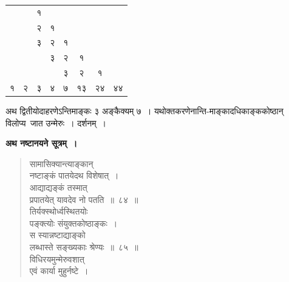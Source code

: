 \documentclass[11pt, openany]{book}
\begin{document}
\begin{tabular}{|c|c|c|c|c|c|c|c|}
	\cline{3-3}
\multicolumn{1}{c}{}  & \multicolumn{1}{c|}{}  &{\hbox{१}}&  \multicolumn{1}{c}{} &  \multicolumn{1}{c}{}&   \multicolumn{1}{c}{}  & \multicolumn{1}{c}{}  & \multicolumn{1}{c}{} \\
\cline{3-4}
\multicolumn{1}{c}{}  & \multicolumn{1}{c|}{} & {\hbox{२}} &{\hbox{१}}&  \multicolumn{1}{c}{} &  \multicolumn{1}{c}{}&   \multicolumn{1}{c}{}  & \multicolumn{1}{c}{}  \\
\cline{3-5}
\multicolumn{1}{c}{} & \multicolumn{1}{c|}{}  &  {\hbox{३}} & {\hbox{२}} &{\hbox{१}}&  \multicolumn{1}{c}{} &  \multicolumn{1}{c}{}&   \multicolumn{1}{c}{}  \\
\cline{3-6}
\multicolumn{1}{c}{} & \multicolumn{1}{c}{} & \multicolumn{1}{c|}{} &  {\hbox{३}} & {\hbox{२}} &{\hbox{१}} & \multicolumn{1}{c}{} & \multicolumn{1}{c}{} \\
\cline{4-7}
\multicolumn{1}{c}{} & \multicolumn{1}{c}{} & \multicolumn{1}{c}{} &\multicolumn{1}{c|}{} & {\hbox{३}} & {\hbox{२}} &{\hbox{१}} & \multicolumn{1}{c}{}   \\
\cline{1-8}
 {\hbox{१}} & {\hbox{२}} & {\hbox{३}} & {\hbox{४}} &{\hbox{७}} & {\hbox{१३}} & {\hbox{२४}} & {\hbox{४४}}  \\
\cline{1-8}
\end{tabular} \hspace{2mm}
\begin{minipage}[]{0.42\textwidth}
\vspace{-6mm}
अथ \;द्वितीयोदाहरणेऽन्तिमाङ्कः \;३ अङ्कैक्यम् ७~। यथोक्तकरणेनान्ति-माङ्कादधिकाङ्ककोष्ठान् विलोप्य~जात उन्मेरुः~। दर्शनम्~। 
\end{minipage}

\newpage

\textbf{अथ नष्टानयने सूत्रम्~।}

\begin{quote}
{\gk सामासिक्यान्त्याङ्कान्\\
नष्टाङ्कं पातयेदथ विशेषात्~।\\
आद्याद्यङ्कं तस्मात्\\
प्रपातयेत् यावदेव नो पतति~॥~८४~॥\\
तिर्यक्स्थोर्ध्वस्थितयोः\\
पङ्क्त्योः संयुक्तकोष्ठाङ्कः~।\\
स स्यान्नष्टाद्याङ्को\\
लब्धास्ते सङ्ख्यकाः श्रेण्यः~॥~८५~॥\\
विधिरयमुन्मेरुवशात्\\
एवं कार्या मुहुर्नष्टे~।}
\end{quote}
\end{document}
